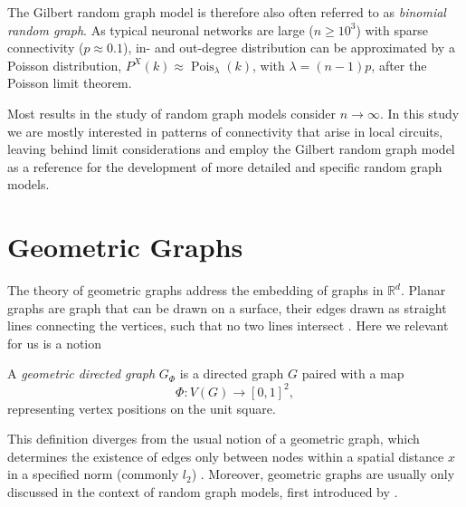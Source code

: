 The Gilbert random graph model is therefore also often referred to as
\textit{binomial random graph}. %
As typical neuronal networks are large ($n \geq 10^3$) with sparse
connectivity ($p \approx 0.1$), in- and out-degree distribution can be
approximated by a Poisson distribution, $P^X(k) \approx
\operatorname{Pois}_{\lambda}(k)$, with $\lambda = (n-1)p$, after the
Poisson limit theorem.

Most results in the study of random graph models consider $n\to
\infty$. In this study we are mostly interested in patterns of
connectivity that arise in local circuits, leaving behind limit
considerations and employ the Gilbert random graph model as a
reference for the development of more detailed and specific random
graph models.




\section{Geometric Graphs}\label{sec:geometric_graphs} 


The theory of geometric graphs address the embedding of graphs in
$\mathbb{R}^d$.  Planar graphs are graph that can be drawn on a
surface, their edges drawn as straight lines connecting the vertices,
such that no two lines intersect \parencite{Diestel_Graph-theory}. %
Here we relevant for us is a notion \textcite{Penrose_Geometric-graph}

\begin{definition}
  A \textit{geometric directed graph}
  $G_{\Phi}$ is a directed graph $G$ paired with a map
  \[
    \Phi:V(G) \to [0,1]^2,
  \]
  representing vertex positions on the unit square.
\end{definition}

This definition diverges from the usual notion of a geometric graph,
which determines the existence of edges only between nodes within a
spatial distance $x$ in a specified norm (commonly
$l_2$) \parencite[108]{Mesbahi_Multiagent-networks}. Moreover,
geometric graphs are usually only discussed in the context of random
graph models, first introduced by \textcite{Gilbert1961}.

